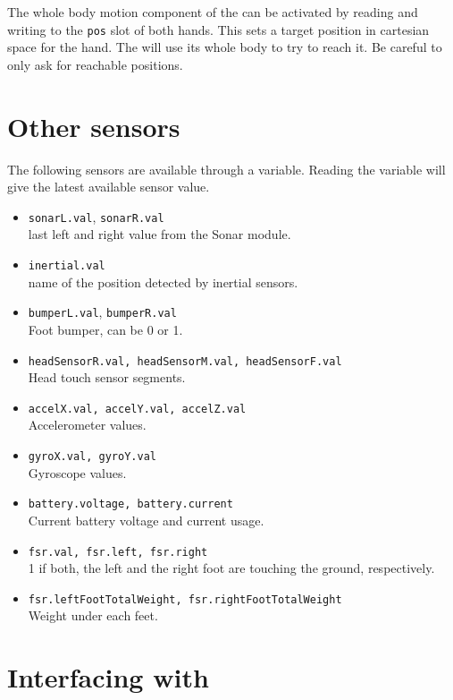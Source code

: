 The whole body motion component of the \naoqi can be activated by reading and
writing to the \lstinline|pos| slot of both hands. This sets a target
position in cartesian space for the hand. The \naoqi will use its whole body
to try to reach it. Be careful to only ask for reachable positions.

\section{Other sensors}

The following sensors are available through a \us variable.
Reading the variable will give the latest available sensor value.

\begin{itemize}
\item \lstinline|sonarL.val|, \lstinline|sonarR.val| \\
    last left and right value from the Sonar module.
\item \lstinline|inertial.val| \\
    name of the position detected by inertial sensors.
\item \lstinline|bumperL.val|, \lstinline|bumperR.val| \\
    Foot bumper, can be 0 or 1.
\item \lstinline|headSensorR.val, headSensorM.val, headSensorF.val| \\
    Head touch sensor segments.
\item \lstinline|accelX.val, accelY.val, accelZ.val| \\
    Accelerometer values.
\item \lstinline|gyroX.val, gyroY.val| \\
    Gyroscope values.
\item \lstinline|battery.voltage, battery.current| \\
    Current battery voltage and current usage.
\item \lstinline|fsr.val, fsr.left, fsr.right| \\
    1 if both, the left and the right foot are touching the ground, respectively.
\item \lstinline|fsr.leftFootTotalWeight, fsr.rightFootTotalWeight| \\
    Weight under each feet.
\end{itemize}

\section{Interfacing with \naoqi}

